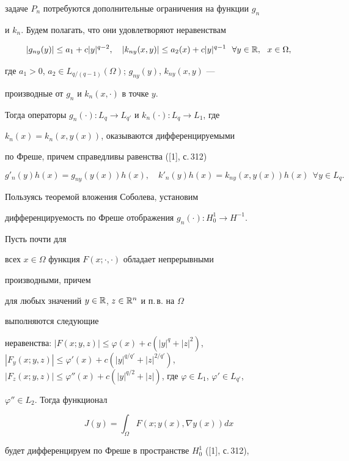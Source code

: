 задаче $P_n$ потребуются дополнительные ограничения на функции $g_n$ 


и $k_n$. Будем полагать, что они удовлетворяют неравенствам 


$$ 


|g_{ny}(y)|\le a_1+c|y|^{q-2},\quad |k_{ny}(x,y)|\le a_2(x)+ 


c|y|^{q-1}\ \ \forall y\in\Bbb R,\ \ x\in\Omega, 


$$ 


где $a_1>0$, $a_2\in L_{q/(q-1)}(\Omega)$; $g_{ny}(y)$, $k_{ny}(x,y)$ --- 


производные от $g_n$ и $k_n(x,\cdot)$ в точке $y$. 


Тогда операторы $g_n(\cdot):L_q\to L_{q'}$ и $k_n(\cdot):L_q\to L_1$, где 


$k_n(x)=k_n(x,y(x))$, оказываются дифференцируемыми 


по Фреше, причем справедливы равенства ([1], с.\,312) 


$$ 


g'_n(y)h(x)=g_{ny}(y(x))h(x),\quad 


k'_n(y)h(x)=k_{ny}(x,y(x))h(x)\ \ \forall y\in L_q. 


$$ 


Пользуясь теоремой вложения Соболева, установим 


дифференцируемость по Фреше отображения $g_n(\cdot):H^1_0\to H^{-1}$. 


Пусть почти для 


всех $x\in\Omega$ функция $F(x;\cdot,\cdot)$ обладает непрерывными 


производными, причем 


для любых значений $y\in\Bbb R$, $z\in\Bbb R^n$ и п.\,в. на $\Omega$ 


выполняются следующие 


неравенства: $|F(x;y,z)|\le \varphi(x)+ c(|y|^q+|z|^2)$, $|F_y(x;y,z)|\le 


\varphi'(x)+ c(|y|^{q/q'}+ |z|^{2/q'})$, $|F_z(x;y,z)| \le\varphi''(x)+ 


c(|y|^{q/2}+|z|)$, где $\varphi\in L_1$, $\varphi'\in L_{q'}$, 


$\varphi''\in L_2$. Тогда функционал 


$$ 


J(y)=\int_\Omega F(x;y(x),\nabla y(x))dx 


$$ 


будет дифференцируем по Фреше в пространстве $H^1_0$ ([1], с.\,312), 


